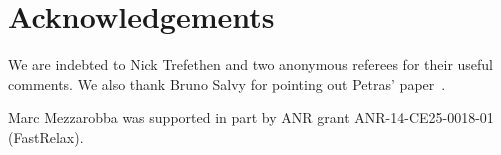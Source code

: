 \documentclass[nohypdvips,review]{siamart0216}
\begin{document}
\section*{Acknowledgements}

We are indebted to Nick Trefethen and two anonymous referees for their
useful comments. We also thank Bruno Salvy for pointing out Petras'
paper~\cite{petras1999computation}.

Marc Mezzarobba was supported in part by ANR grant ANR-14-CE25-0018-01
(Fast\-Relax).



\end{document}
